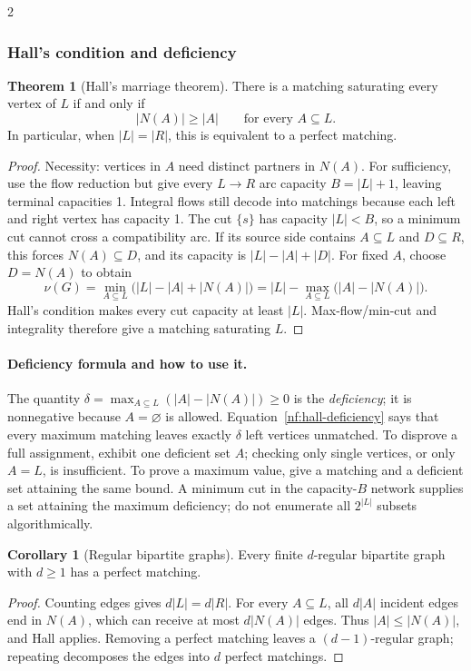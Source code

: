 \documentclass[8pt]{extarticle}
\theoremstyle{definition}
\newtheorem{theorem}[definition]{Theorem}
\newtheorem{corollary}[definition]{Corollary}
\begin{document}
\begin{multicols*}{2}
\subsubsection*{Hall's condition and deficiency}
\begin{theorem}[Hall's marriage theorem]\label{nf:hall}
There is a matching saturating every vertex of $L$ if and only if
\[
 |N(A)|\ge |A|\qquad\text{for every }A\subseteq L.
\]
In particular, when $|L|=|R|$, this is equivalent to a perfect matching.
\end{theorem}
\begin{proof}
Necessity: vertices in $A$ need distinct partners in $N(A)$.
For sufficiency, use the flow reduction but give every $L\to R$ arc
capacity $B=|L|+1$, leaving terminal capacities 1. Integral flows still
decode into matchings because each left and right vertex has capacity 1.
The cut $\{s\}$ has capacity $|L|<B$, so a minimum cut cannot cross a
compatibility arc. If its source side contains $A\subseteq L$ and
$D\subseteq R$, this forces $N(A)\subseteq D$, and its capacity is
$|L|-|A|+|D|$. For fixed $A$, choose $D=N(A)$ to obtain
\begin{equation}\label{nf:hall-deficiency}
 \nu(G)=\min_{A\subseteq L}\bigl(|L|-|A|+|N(A)|\bigr)
       =|L|-\max_{A\subseteq L}\bigl(|A|-|N(A)|\bigr).
\end{equation}
Hall's condition makes every cut capacity at least $|L|$. Max-flow/min-cut
and integrality therefore give a matching saturating $L$.
\end{proof}
\paragraph{Deficiency formula and how to use it.}
The quantity $\delta=\max_{A\subseteq L}(|A|-|N(A)|)\ge0$ is the
\emph{deficiency}; it is nonnegative because $A=\varnothing$ is allowed.
Equation~\eqref{nf:hall-deficiency} says that every maximum matching leaves
exactly $\delta$ left vertices unmatched. To disprove a full assignment,
exhibit one deficient set $A$; checking only single vertices, or only
$A=L$, is insufficient. To prove a maximum value, give a matching and a
deficient set attaining the same bound. A minimum cut in the capacity-$B$
network supplies a set attaining the maximum deficiency; do not enumerate
all $2^{|L|}$ subsets algorithmically.

\begin{samepage}
\begin{corollary}[Regular bipartite graphs]
Every finite $d$-regular bipartite graph with $d\ge1$ has a perfect matching.
\end{corollary}
\begin{proof}
Counting edges gives $d|L|=d|R|$. For every $A\subseteq L$, all $d|A|$
incident edges end in $N(A)$, which can receive at most $d|N(A)|$ edges.
Thus $|A|\le|N(A)|$, and Hall applies. Removing a perfect matching leaves
a $(d-1)$-regular graph; repeating decomposes the edges into $d$ perfect
matchings.
\end{proof}
\end{samepage}


\end{multicols*}
\end{document}
